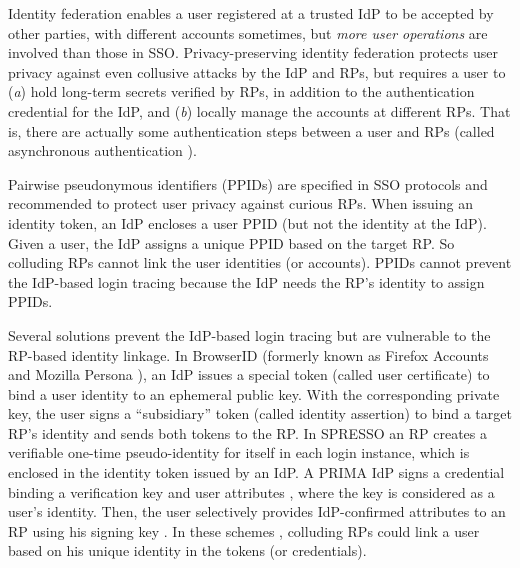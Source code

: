 Identity federation enables a user registered at a trusted IdP to be accepted by other parties,
            with different accounts sometimes,
        but \emph{more user operations} are involved than those in SSO.
Privacy-preserving identity federation
    protects user privacy against even collusive attacks by the IdP and RPs,
    but requires a user \cite{ELPASSO,UnlimitID,hyperledge-idemix,PseudoID,Opaak,uprov} to (\emph{a}) hold long-term secrets verified by RPs,
            in addition to the authentication credential for the IdP,
                and (\emph{b}) locally manage the accounts at different RPs.
That is, there are actually some authentication steps between a user and RPs (called asynchronous authentication \cite{ELPASSO}).

Pairwise pseudonymous identifiers (PPIDs) are specified in SSO protocols \cite{OpenIDConnect, SAMLIdentifier} and recommended \cite{NIST2017draft}
to protect user privacy against curious RPs.
When issuing an identity token,
        an IdP encloses a user PPID (but not the identity at the IdP).
Given a user, the IdP assigns a unique PPID based on the target RP.
So colluding RPs cannot link the user identities (or accounts).
PPIDs cannot prevent the IdP-based login tracing because the IdP needs the RP's identity to assign PPIDs.



Several solutions prevent the IdP-based login tracing but are vulnerable to the RP-based identity linkage.
In BrowserID \cite{BrowserID} (formerly known as Firefox Accounts \cite{FirefoxAccount} and Mozilla Persona \cite{persona}), an IdP %
issues a special token (called user certificate) to bind a user identity to an ephemeral public key.
With the corresponding private key, the user signs a ``subsidiary'' token (called identity assertion) to bind a target RP's identity and sends both tokens to the RP.
In SPRESSO \cite{SPRESSO} an RP creates a verifiable one-time pseudo-identity for itself in each login instance,
 which is enclosed in the identity token issued by an IdP. %
A PRIMA IdP signs a credential
 binding a verification key and user attributes \cite{prima},
  where the key is considered as a user's identity.
Then, the user selectively provides IdP-confirmed attributes to an RP using his signing key \cite{Oblivion}.
In these schemes \cite{BrowserID,SPRESSO,prima}, colluding RPs could link a user based on his unique identity in the tokens (or credentials).


